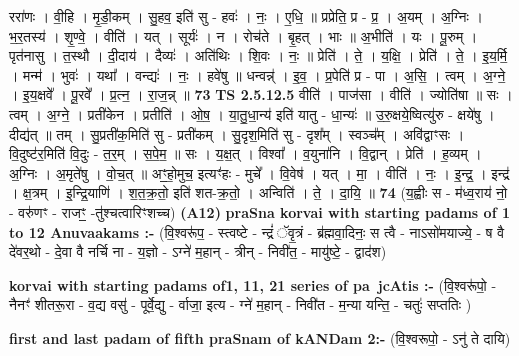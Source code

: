 \documentclass[17pt]{extarticle}
\begin{document}
                  ररा॑णः । वी॒हि । मृ॒डी॒कम् । सु॒हव॒ इति॑ सु - हवः॑ । नः॒ । ए॒धि॒ ॥ प्रप्रेति॒ प्र - प्र॒ । अ॒यम् । अ॒ग्निः । भ॒र॒तस्य॑ । शृ॒ण्वे॒ । वीति॑ । यत् । सूर्यः॑ । न । रोच॑ते । बृ॒हत् । भाः ॥ अ॒भीति॑ । यः । पू॒रुम् । पृत॑नासु । त॒स्थौ । दी॒दाय॑ । दैव्यः॑ । अति॑थिः । शि॒वः । नः॒ ॥ प्रेति॑ । ते॒ । य॒क्षि॒ । प्रेति॑ । ते॒ । इ॒य॒र्मि॒ । मन्म॑ । भुवः॑ । यथा᳚ । वन्द्यः॑ । नः॒ । हवे॑षु ॥ धन्वन्न्॑ । इ॒व॒ । प्र॒पेति॑ प्र - पा । अ॒सि॒ । त्वम् । अ॒ग्ने॒ । इ॒य॒क्षवे᳚ । पू॒रवे᳚ । प्र॒त्न॒ । रा॒ज॒न्न् ॥ \textbf{  73} \newline
                  \newline
                                \textbf{ TS 2.5.12.5} \newline
                  वीति॑ । पाज॑सा । वीति॑ । ज्योति॑षा ॥ सः । त्वम् । अ॒ग्ने॒ । प्रती॑केन । प्रतीति॑ । ओ॒ष॒ । या॒तु॒धा॒न्य॑ इति॑ यातु - धा॒न्यः॑ ॥ उ॒रु॒क्षये॒ष्वित्यु॑रु - क्षये॑षु । दीद्य॑त् ॥ तम् । सु॒प्रती॑क॒मिति॑ सु - प्रती॑कम् । सु॒दृश॒मिति॑ सु - दृश᳚म् । स्वञ्च᳚म् । अवि॑द्वाꣳसः । वि॒दुष्ट॑र॒मिति॑ वि॒दुः - त॒र॒म् । स॒पे॒म॒ ॥ सः । य॒क्ष॒त् । विश्वा᳚ । व॒युना॑नि । वि॒द्वान् । प्रेति॑ । ह॒व्यम् । अ॒ग्निः । अ॒मृते॑षु । वो॒च॒त् ॥ अꣳ॒॒हो॒मुच॒ इत्यꣳ॑हः - मुचे᳚ । वि॒वेष॑ । यत् । मा॒ । वीति॑ । नः॒ । इ॒न्द्र॒ । इन्द्र॑ । क्ष॒त्रम् । इ॒न्द्रि॒याणि॑ । श॒त॒क्र॒तो॒ इति॑ शत-क्र॒तो॒ । अन्विति॑ । ते॒ । दा॒यि॒ ॥ \textbf{  74 } \newline
                  \newline
                      (य॒ह्वीः स - म॑ध्व॒राय॑ नो॒ - वरु॑णꣳ - राजꣳ॒॒ -तु॑श्चत्वारिꣳशच्च)  \textbf{(A12)} \newline \newline
\textbf{praSna korvai with starting padams of 1 to 12 Anuvaakams :-} \newline
(वि॒श्वरू॑प॒ - स्त्वष्टे - न्द्रं॑ ॅवृ॒त्रं - ब्र॑ह्मवा॒दिनः॒ स त्वै - नाऽसो॑मयाज्ये॒ - ष वै दे॑वर॒थो - दे॒वा वै नर्चि ना - य॒ज्ञो - ऽग्ने॑ म॒हान् - त्रीन् - निवी॑त॒ - मायु॑ष्टे॒ - द्वाद॑श) \newline

\textbf{korvai with starting padams of1, 11, 21 series of pa~jcAtis :-} \newline
(वि॒श्वरू॑पो॒ - नैनꣳ॑ शीतरू॒रा - व॒द्य वसु॑ - पूर्वे॒द्यु - र्वाजा॒ इत्य - ग्ने॑ म॒हान् - निवी॑त - म॒न्या यन्ति॒ - चतुः॑ सप्ततिः ) \newline

\textbf{first and last padam of fifth praSnam of kANDam 2:-} \newline
(वि॒श्वरूपो॒ - ऽनु॑ ते दायि) \newline 
\end{document}
